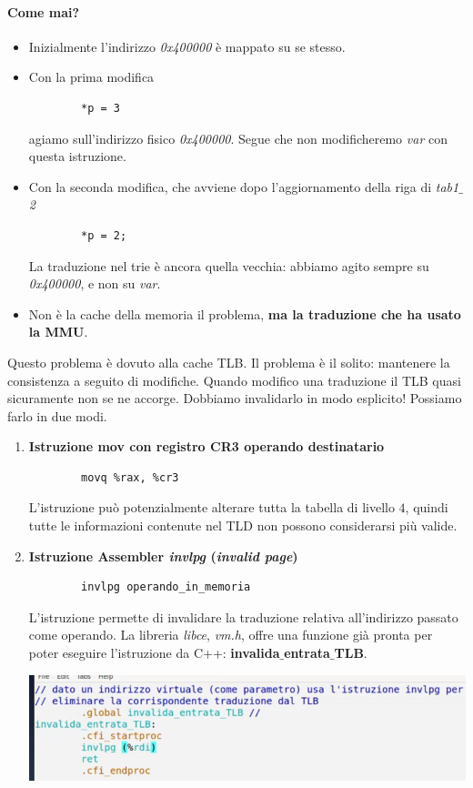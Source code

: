 \paragraph{Come mai?} 
\begin{itemize}
	\item Inizialmente l'indirizzo \emph{0x400000} è mappato su se stesso. 
	\item Con la prima modifica
	\begin{verbatim}
		*p = 3
	\end{verbatim}
	agiamo sull'indirizzo fisico \emph{0x400000}. Segue che non modificheremo \emph{var} con questa istruzione.
	\item Con la seconda modifica, che avviene dopo l'aggiornamento della riga di \emph{tab1$\_$2}
	\begin{verbatim}
		*p = 2;
	\end{verbatim} La traduzione nel trie è ancora quella vecchia: abbiamo agito sempre su \emph{0x400000}, e non su \emph{var}.
	\item Non è la cache della memoria il problema, \textbf{ma la traduzione che ha usato la MMU}.
\end{itemize}
Questo problema è dovuto alla cache TLB. Il problema è il solito: mantenere la consistenza a seguito di modifiche. Quando modifico una traduzione il TLB quasi sicuramente non se ne accorge. Dobbiamo invalidarlo in modo esplicito! Possiamo farlo in due modi.
\begin{enumerate}
	\item \textbf{Istruzione mov con registro CR3 operando destinatario}
	\begin{verbatim}
		movq %rax, %cr3
	\end{verbatim}
	L'istruzione può potenzialmente alterare tutta la tabella di livello $4$, quindi tutte le informazioni contenute nel TLD non possono considerarsi più valide. 
	\item \textbf{Istruzione Assembler \emph{invlpg} (\emph{invalid page})}
	\begin{verbatim}
		invlpg operando_in_memoria
	\end{verbatim}
	L'istruzione permette di invalidare la traduzione relativa all'indirizzo passato come operando. La libreria \emph{libce},  \emph{vm.h}, offre una funzione già pronta per poter eseguire l'istruzione da C++: \textbf{invalida$\_$entrata$\_$TLB}.
	\begin{center}
		\includegraphics[scale=.8]{img/235.PNG}
	\end{center} 
\end{enumerate}
